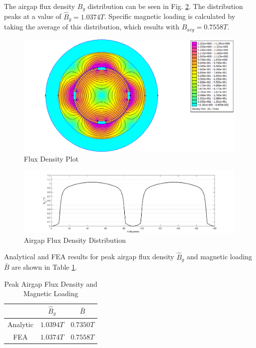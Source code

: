 \documentclass[a4paper, 11pt, titlepage]{article}
\begin{document}
The airgap flux density $B_g$ distribution can be seen in Fig. \ref{fig:airgapBplot}. The distribution peaks at a value of $\hat{B}_g = 1.0374T$. Specific magnetic loading is calculated by taking the average of this distribution, which results with $B_{avg}=0.7558T$.

\begin{figure}[h]
	\includegraphics[width=\textwidth]{fluxDensity.png}
	\caption{Flux Density Plot}
	\label{fig:Bmap}
\end{figure}

\begin{figure}[h]
	\includegraphics[width=\textwidth]{airgapFluxDensity.png}
	\caption{Airgap Flux Density Distribution}
	\label{fig:airgapBplot}
\end{figure}

Analytical and FEA results for peak airgap flux density $\hat{B}_g$ and magnetic loading $\bar{B}$ are shown in Table \ref{fig:BpeakandBavg}.

\begin{table}[h]
	\begin{center}
		\begin{tabular}{c|c|c}
			 &  $\hat{B}_g$ & $\bar{B}$ \\
			\hline
			Analytic & $1.0394T$ & $0.7350T$ \\
			\hline
			FEA & $1.0374T$ & $0.7558T$ \\ 
			\hline
		\end{tabular}
	\end{center}
	\caption{Peak Airgap Flux Density and Magnetic Loading}
	\label{fig:BpeakandBavg}
\end{table}
\end{document}
